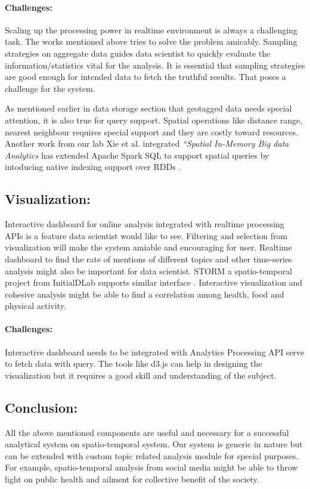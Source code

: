 \vspace{-2mm}
\paragraph{Challenges:}
Scaling up the processing power in realtime environment is always a challenging task. The works mentioned above tries to solve the problem amicably. Sampling strategies on aggregate data guides data scientist to quickly
evaluate the information/statistics vital for the analysis. It is essential that sampling strategies are good enough for intended data to fetch the truthful results. That poses a challenge for the system.

As mentioned earlier in data storage section that geotagged data needs special attention, it is also true for query support.
Spatial operations like distance range, nearest neighbour requires special support and they are costly toward resources. Another work from our lab Xie et al. integrated {\em ``Spatial In-Memory Big data Analytics}  \cite{xie2016simba} has extended Apache Spark SQL to support spatial queries by intoducing native indexing support over RDDs \cite{zaharia2012resilient}.

\subsection{Visualization:}
Interactive dashboard for online analysis integrated with realtime processing APIs is a feature data scientist would like to see. Filtering and selection from visualization will make the system amiable and encouraging for user. Realtime dashboard to find the rate of mentions of different topics and other time-series analysis might also be important for data scientist. STORM a spatio-temporal project from InitialDLab supports similar interface \cite{christensen2015storm}. Interactive visualization and cohesive analysis might be able to find a correlation among health, food and physical activity.

\vspace{-2mm}
\paragraph{Challenges:}
Interactive dashboard needs to be integrated with Analytics Processing API serve to fetch data with query. The tools like d3.js can help in designing the visualization but it requires a good skill and understanding of the subject.


\subsection{Conclusion:}
All the above mentioned components are useful and necessary for a successful analytical system on spatio-temporal system. Our system is generic in nature but can be extended with custom topic related analysis module for special purposes. For example, spatio-temporal analysis from social media might be able to throw light on public health and ailment for collective benefit of the society.


